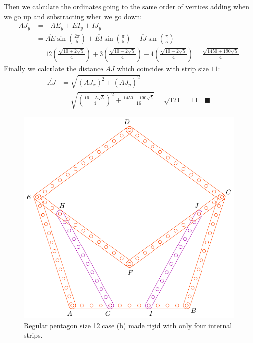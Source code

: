 \documentclass[11pt]{article}
\begin{document}
Then we calculate the ordinates going to the same order of vertices adding when we go up and substracting when we go down:
\begin{align}
AJ_y &= -AE_y + EI_y + IJ_y\nonumber\\
 &= \overline{AE}\sin\left(\frac{2\pi}5\right)
 + \overline{EI}\sin\left(\frac{\pi}5\right) 
 - \overline{IJ}\sin\left(\frac{\pi}5\right)\nonumber\\
 &= 12\left(\frac{\sqrt{10+2\sqrt5}}4\right)
 + 3\left(\frac{\sqrt{10-2\sqrt5}}4\right)
 - 4\left(\frac{\sqrt{10-2\sqrt5}}4\right)%
 = \frac{\sqrt{1450+190\sqrt5}}4
\end{align}
Finally we calculate the distance $\overline{AJ}$ which coincides with strip size $11$:
\begin{align}
\overline{AJ} &= \sqrt{(AJ_x)^2 + (AJ_y)^2}\nonumber\\
 &= \sqrt{\left(\frac{19-5\sqrt5}4\right)^2 + \frac{1450+190\sqrt5}{16}}%
 = \sqrt{121} = 11 \quad\blacksquare
\end{align}

\begin{figure}[h]
 \centering
 \includegraphics[scale=0.8]{12/penta12b}
 \caption{Regular pentagon size 12 case (b) made rigid with only four internal strips.}
 \label{fig:penta12b}
\end{figure}
\end{document}
